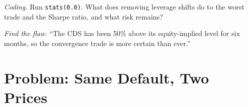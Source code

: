\begin{exercise}[$\star\star\star$]\label{exo:s2:capital-structure-arbitrage:7}
\emph{Coding.} Run \texttt{stats(0.0)}. What does removing leverage shifts do to the worst trade and the Sharpe ratio, and what risk remains?
\end{exercise}

\begin{exercise}[$\star\star\star$]\label{exo:s2:capital-structure-arbitrage:8}
\emph{Find the flaw.} ``The CDS has been 50\% above its equity-implied level for six months, so the convergence trade is more certain than ever.''
\end{exercise}

\section{Problem: Same Default, Two Prices}

